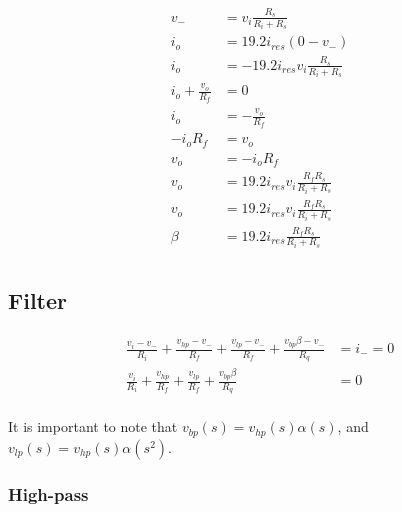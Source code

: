 \documentclass{article}
\begin{document}
\begin{equation*}
\begin{split}
  v_- & = v_i\frac{R_s}{R_i + R_s} \\
  i_o & = 19.2i_{res}(0 - v_-) \\
  i_o & = -19.2i_{res}v_i\frac{R_s}{R_i + R_s} \\
  i_o + \frac{v_o}{R_f} & = 0 \\
  i_o & = -\frac{v_o}{R_f} \\
  -i_o{R_f} & = v_o \\
  v_o & = -i_o{R_f} \\
  v_o & = 19.2i_{res}v_i\frac{R_fR_s}{R_i + R_s} \\
  v_o & = 19.2i_{res}v_i\frac{R_fR_s}{R_i + R_s} \\
  \beta & = 19.2i_{res}\frac{R_fR_s}{R_i + R_s} \\
\end{split}
\end{equation*}

\subsection{Filter}

\begin{equation*}
\begin{split}
  \frac{v_i - v_-}{R_i} + \frac{v_{hp} - v_-}{R_f} + \frac{v_{lp} - v_-}{R_f}  + \frac{v_{bp}\beta - v_-}{R_q} & = i_- = 0 \\
  \frac{v_i}{R_i} + \frac{v_{hp}}{R_f} + \frac{v_{lp}}{R_f}  + \frac{v_{bp}\beta}{R_q} & = 0 \\
\end{split}
\end{equation*}

It is important to note that $v_{bp}(s) = v_{hp}(s)\alpha(s)$, and $v_{lp}(s) = v_{hp}(s)\alpha(s^2)$.

\subsubsection{High-pass}
\end{document}
